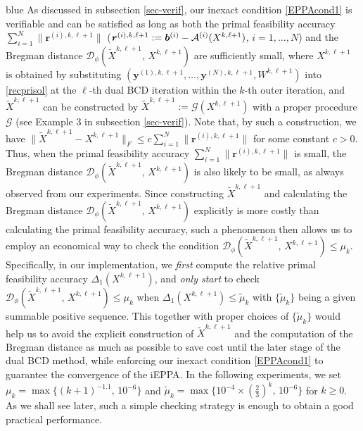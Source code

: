 \documentclass[10pt]{article}
\newcommand{\blue}[1]{\begin{color}{blue}#1\end{color}}
\newcommand{\cA}{{\cal A}}
\begin{document}
\blue{
As discussed in subsection \ref{sec-verif}, our inexact condition \eqref{EPPAcond1} is verifiable and can be satisfied as long as both the primal feasibility accuracy ${\textstyle\sum^N_{i=1}}\|\bm{r}^{(i),k,\ell+1}\|$ ($\bm{r}^{(i),k,\ell+1}:=\bm{b}^{(i)} - \cA^{(i)}(X^{k,\ell+1})$, $i=1,\dots,N$) and the Bregman distance $\mathcal{D}_{\phi}(\widetilde{X}^{k,\ell+1}, \,X^{k,\ell+1})$ are sufficiently small, where $X^{k,\ell+1}$ is obtained by substituting $(\bm{y}^{(1),k,\ell+1},\dots,\bm{y}^{(N),k,\ell+1},W^{k,\ell+1})$ into \eqref{recprisol} at the $\ell$-th dual BCD iteration within the $k$-th outer iteration, and $\widetilde{X}^{k,\ell+1}$ can be constructed by $\widetilde{X}^{k,\ell+1}:=\mathcal{G}(X^{k,\ell+1})$ with a proper procedure $\mathcal{G}$ (see Example 3 in subsection \ref{sec-verif}). Note that, by such a construction, we have $\|\widetilde{X}^{k,\ell+1}-X^{k,\ell+1}\|_F \leq c\sum^N_{i=1}\|\bm{r}^{(i),k,\ell+1}\|$ for some constant $c>0$. Thus, when the primal feasibility accuracy $\sum^N_{i=1}\|\bm{r}^{(i),k,\ell+1}\|$ is small, the Bregman distance $\mathcal{D}_{\phi}(\widetilde{X}^{k,\ell+1}, \,X^{k,\ell+1})$ is also likely to be small, as always observed from our experiments. Since constructing $\widetilde{X}^{k,\ell+1}$ and calculating the Bregman distance $\mathcal{D}_{\phi}(\widetilde{X}^{k,\ell+1}, \,X^{k,\ell+1})$ explicitly is more costly than calculating the primal feasibility accuracy, such a phenomenon
then allows us to employ an economical way to check the condition $\mathcal{D}_{\phi}(\widetilde{X}^{k,\ell+1}, \,X^{k,\ell+1})\leq\mu_k$. Specifically, in our implementation, we \textit{first} compute the relative primal feasibility accuracy $\Delta_1(X^{k,\ell+1})$, and \textit{only start} to check $\mathcal{D}_{\phi}(\widetilde{X}^{k,\ell+1}, \,X^{k,\ell+1})\leq\mu_k$ when $\Delta_1(X^{k,\ell+1})\leq\widetilde{\mu}_k$ with $\{\widetilde{\mu}_k\}$ being a given summable positive sequence. This together with proper choices of $\{\widetilde{\mu}_k\}$ would help us to avoid the explicit construction of $\widetilde{X}^{k,\ell+1}$ and the computation of the Bregman distance as much as possible to save cost until the later stage of the dual BCD method, while enforcing our inexact condition \eqref{EPPAcond1} to guarantee the convergence of the iEPPA. In the following experiments, we set $\mu_k=\max\big\{(k+1)^{-1.1},\,10^{-6}\big\}$ and  $\widetilde{\mu}_k=\max\big\{10^{-4}\times\left(\frac{2}{3}\right)^k,\,10^{-6}\big\}$ for $k\geq0$. As we shall see later, such a simple checking strategy is enough to obtain a good practical performance.
}
\end{document}
